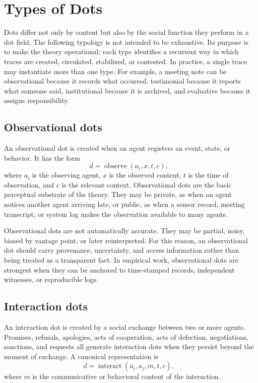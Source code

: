 \documentclass[11pt]{article}
\theoremstyle{remark}
\begin{document}
\section{Types of Dots}\label{types-of-dots}

Dots differ not only by content but also by the social function they perform in a dot field. The following typology is not intended to be exhaustive. Its purpose is to make the theory operational: each type identifies a recurrent way in which traces are created, circulated, stabilized, or contested. In practice, a single trace may instantiate more than one type. For example, a meeting note can be observational because it records what occurred, testimonial because it reports what someone said, institutional because it is archived, and evaluative because it assigns responsibility.

\subsection{Observational dots}\label{observational-dots}

An observational dot is created when an agent registers an event, state, or behavior. It has the form
\[
d=\operatorname{observe}(a_i,x,t,c),
\]
where $a_i$ is the observing agent, $x$ is the observed content, $t$ is the time of observation, and $c$ is the relevant context. Observational dots are the basic perceptual substrate of the theory. They may be private, as when an agent notices another agent arriving late, or public, as when a sensor record, meeting transcript, or system log makes the observation available to many agents.

Observational dots are not automatically accurate. They may be partial, noisy, biased by vantage point, or later reinterpreted. For this reason, an observational dot should carry provenance, uncertainty, and access information rather than being treated as a transparent fact. In empirical work, observational dots are strongest when they can be anchored to time-stamped records, independent witnesses, or reproducible logs.

\subsection{Interaction dots}\label{interaction-dots}

An interaction dot is created by a social exchange between two or more agents. Promises, refusals, apologies, acts of cooperation, acts of defection, negotiations, sanctions, and requests all generate interaction dots when they persist beyond the moment of exchange. A canonical representation is
\[
d=\operatorname{interact}(a_i,a_j,m,t,c),
\]
where $m$ is the communicative or behavioral content of the interaction.
\end{document}
